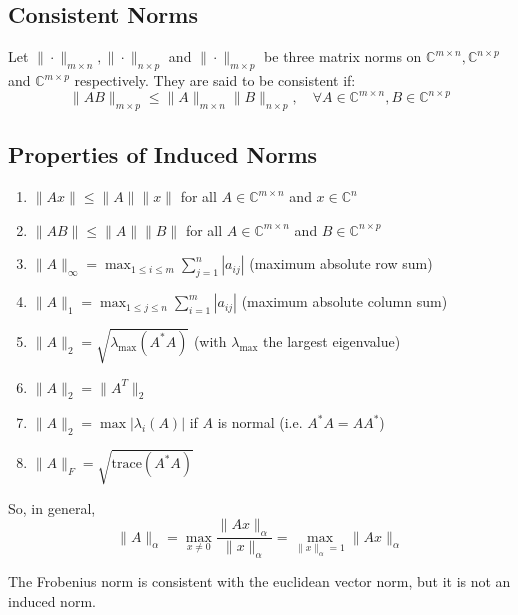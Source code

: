 \documentclass[11pt]{article}
\begin{document}
\subsection{Consistent Norms}
Let $\|\cdot\|_{m \times n}, \|\cdot\|_{n \times p}$ and $\|\cdot\|_{m \times p}$ be three matrix norms on $\mathbb{C}^{m \times n}, \mathbb{C}^{n \times p}$ and $\mathbb{C}^{m \times p}$ respectively. They are said to be consistent if:
\[\|AB\|_{m \times p} \leq \|A\|_{m \times n} \|B\|_{n \times p}, \quad \forall A \in \mathbb{C}^{m \times n}, B \in \mathbb{C}^{n \times p}\]

\subsection{Properties of Induced Norms}
\begin{enumerate}
    \item $\|Ax\| \leq \|A\| \|x\|$ for all $A \in \mathbb{C}^{m \times n}$ and $x \in \mathbb{C}^n$
    \item $\|AB\| \leq \|A\| \|B\|$ for all $A \in \mathbb{C}^{m \times n}$ and $B \in \mathbb{C}^{n \times p}$
    \item $\|A\|_\infty = \max_{1 \leq i \leq m} \sum_{j=1}^{n} |a_{ij}|$ (maximum absolute row sum)
    \item $\|A\|_1 = \max_{1 \leq j \leq n} \sum_{i=1}^{m} |a_{ij}|$ (maximum absolute column sum)
    \item $\|A\|_2 = \sqrt{\lambda_{\max}(A^* A)}$ (with $\lambda_{\max}$ the largest eigenvalue)
    \item $\|A\|_2 = \|A^T\|_2$
    \item $\|A\|_2 = \max |\lambda_i(A)|$ if $A$ is normal (i.e. $A^* A = A A^*$)
    \item $\|A\|_F = \sqrt{\text{trace}(A^* A)}$
\end{enumerate} 

So, in general,
\[\|A\|_\alpha = \max_{x \neq 0} \frac{\|Ax\|_\alpha}{\|x\|_\alpha} = \max_{\|x\|_\alpha = 1} \|Ax\|_\alpha\]

The Frobenius norm is consistent with the euclidean vector norm, but it is not an induced norm.
\end{document}
